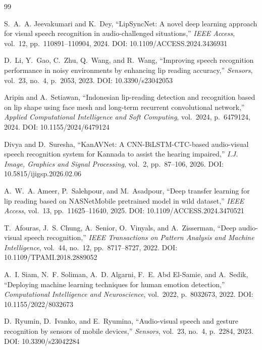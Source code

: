 \begin{thebibliography}{99}
\setlength{\itemsep}{3pt}

S.~A.~A. Jeevakumari and K.~Dey, ``LipSyncNet: A novel deep learning approach for
visual speech recognition in audio-challenged situations,'' \emph{IEEE Access},
vol.~12, pp.~110891--110904, 2024. DOI: 10.1109/ACCESS.2024.3436931

D.~Li, Y.~Gao, C.~Zhu, Q.~Wang, and R.~Wang, ``Improving speech recognition
performance in noisy environments by enhancing lip reading accuracy,''
\emph{Sensors}, vol.~23, no.~4, p.~2053, 2023. DOI: 10.3390/s23042053

Aripin and A.~Setiawan, ``Indonesian lip-reading detection and recognition based
on lip shape using face mesh and long-term recurrent convolutional network,''
\emph{Applied Computational Intelligence and Soft Computing}, vol.~2024,
p.~6479124, 2024. DOI: 10.1155/2024/6479124

Divya and D.~Suresha, ``KanAVNet: A CNN-BiLSTM-CTC-based audio-visual speech
recognition system for Kannada to assist the hearing impaired,'' \emph{I.J. Image,
Graphics and Signal Processing}, vol.~2, pp.~87--106, 2026.
DOI: 10.5815/ijigsp.2026.02.06

A.~W.~A. Ameer, P.~Salehpour, and M.~Asadpour, ``Deep transfer learning for lip
reading based on NASNetMobile pretrained model in wild dataset,'' \emph{IEEE
Access}, vol.~13, pp.~11625--11640, 2025. DOI: 10.1109/ACCESS.2024.3470521

T.~Afouras, J.~S. Chung, A.~Senior, O.~Vinyals, and A.~Zisserman, ``Deep
audio-visual speech recognition,'' \emph{IEEE Transactions on Pattern Analysis and
Machine Intelligence}, vol.~44, no.~12, pp.~8717--8727, 2022.
DOI: 10.1109/TPAMI.2018.2889052

A.~I. Siam, N.~F. Soliman, A.~D. Algarni, F.~E. Abd El-Samie, and A.~Sedik,
``Deploying machine learning techniques for human emotion detection,''
\emph{Computational Intelligence and Neuroscience}, vol.~2022, p.~8032673, 2022.
DOI: 10.1155/2022/8032673

D.~Ryumin, D.~Ivanko, and E.~Ryumina, ``Audio-visual speech and gesture recognition
by sensors of mobile devices,'' \emph{Sensors}, vol.~23, no.~4, p.~2284, 2023.
DOI: 10.3390/s23042284

\end{thebibliography}
\endgroup

